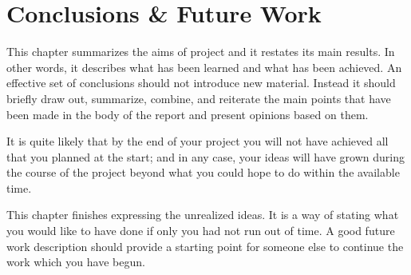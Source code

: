 
\chapter{Conclusions \& Future Work}\label{ch:conclusion}

This chapter summarizes the aims of project and it restates its main results. In other words, it describes what has been learned and what has been achieved. An effective set of conclusions should not introduce new material. Instead it should briefly draw out, summarize, combine, and reiterate the main points that have been made in the body of the report and present opinions based on them.

It is quite likely that by the end of your project you will not have achieved all that you planned at the start; and in any case, your ideas will have grown during the course of the project beyond what you could hope to do within the available time.

This chapter finishes expressing the unrealized ideas. It is a way of stating what you would like to have done if only you had not run out of time. A good future work description should provide a starting point for someone else to continue the work which you have begun.